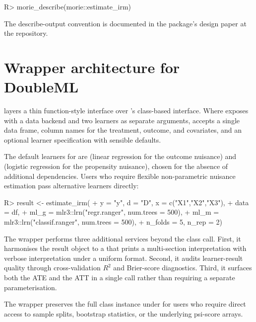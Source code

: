 \documentclass[article,shortnames,nojss]{jss}
\begin{document}
\begin{Code}
R> morie_describe(morie::estimate_irm)
\end{Code}

\noindent The describe-output convention is documented in the
package's design paper at the repository.

\section{Wrapper architecture for DoubleML}
\label{sec:wrapper}

 layers a thin function-style interface over
's class-based interface. Where 
exposes  with a
data backend and two  learners as separate arguments,
 accepts a single data frame, column
names for the treatment, outcome, and covariates, and an optional
learner specification with sensible defaults.

The default learners for  are
 (linear regression for the outcome nuisance)
and  (logistic regression for the
propensity nuisance), chosen for the absence of additional
dependencies. Users who require flexible non-parametric nuisance
estimation pass alternative  learners directly:

\begin{Code}
R> result <- estimate_irm(
+   y       = "y", d = "D", x = c("X1","X2","X3"),
+   data    = df,
+   ml_g    = mlr3::lrn("regr.ranger", num.trees = 500),
+   ml_m    = mlr3::lrn("classif.ranger", num.trees = 500),
+   n_folds = 5, n_rep = 2)
\end{Code}

\noindent The wrapper performs three additional services beyond
the  class call. First, it harmonises the result
object to a  that prints a multi-section
interpretation with verbose interpretation under a uniform format.
Second, it audits learner-result quality through cross-validation
$R^{2}$ and Brier-score diagnostics. Third, it surfaces both the
ATE and the ATT in a single call rather than requiring a separate
 parameterisation.

The wrapper preserves the full  class instance under
 for users who require direct access to
sample splits, bootstrap statistics, or the underlying psi-score
arrays.
\end{document}
